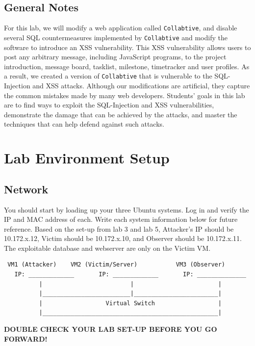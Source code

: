 \documentclass{article}
\begin{document}
\subsection{General Notes}
For this lab, we will modify a web application called {\tt Collabtive},
and disable several SQL countermeasures implemented by
{\tt Collabtive} and modify the software to introduce an XSS vulnerability. This XSS vulnerability allows users to post any arbitrary message, including JavaScript programs, to the project introduction, message board, tasklist, milestone, timetracker and user profiles. As a result, we created a version of {\tt Collabtive}
that is vulnerable to the SQL-Injection and XSS attacks. Although
our modifications are artificial, they capture the common 
mistakes made by many web developers. Students' goals in 
this lab are to find ways to exploit the SQL-Injection and XSS
vulnerabilities, demonstrate the damage that can 
be achieved by the attacks, and master the 
techniques that can help defend against such attacks.



\section{Lab Environment Setup}
\subsection{Network}
You should start by loading up your three Ubuntu systems. Log in and verify the IP and MAC address of each. Write each system information below for future reference. Based on the set-up from lab 3 and lab 5, Attacker's IP should be 10.172.x.12, Victim should be 10.172.x.10, and Observer should be 10.172.x.11. The exploitable database and webserver are only on the Victim VM.

\begin{verbatim}
 VM1 (Attacker)    VM2 (Victim/Server)           VM3 (Observer)
   IP: _____________       IP: _____________       IP: ______________
          |                         |                        |
          |_________________________|________________________|
          |                  Virtual Switch                  |
          |__________________________________________________|

\end{verbatim}

\textbf{DOUBLE CHECK YOUR LAB SET-UP BEFORE YOU GO FORWARD!}  
\end{document}
